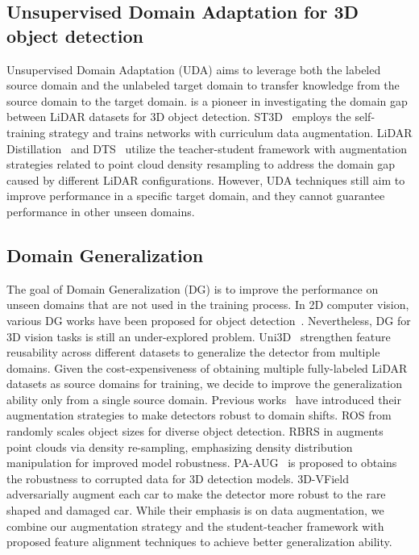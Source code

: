 \subsection{Unsupervised Domain Adaptation for 3D object detection}
Unsupervised Domain Adaptation (UDA) aims to leverage both the labeled source domain and the unlabeled target domain to transfer knowledge from the source domain to the target domain. \cite{wang2020train} is a pioneer in investigating the domain gap between LiDAR datasets for 3D object detection. ST3D~\cite{yang2021st3d} employs the self-training strategy and trains networks with curriculum data augmentation. LiDAR Distillation~\cite{wei2022lidar} and DTS~\cite{hu2023density} utilize the teacher-student framework with augmentation strategies related to point cloud density resampling to address the domain gap caused by different LiDAR configurations. However, UDA techniques still aim to improve performance in a specific target domain, and they cannot guarantee performance in other unseen domains.

\subsection{Domain Generalization}
The goal of Domain Generalization (DG) is to improve the performance on unseen domains that are not used in the training process. In 2D computer vision, various DG works have been proposed for object detection~\cite{wu2022single, vidit2023clip}. Nevertheless, DG for 3D vision tasks is still an under-explored problem. Uni3D~\cite{zhang2023uni3d} strengthen feature reusability across different datasets to generalize the detector from multiple domains. Given the cost-expensiveness of obtaining multiple fully-labeled LiDAR datasets as source domains for training, we decide to improve the generalization ability only from a single source domain. Previous works~\cite{yang2021st3d, choi2021part, lehner20223d, hu2023density} have introduced their augmentation strategies to make detectors robust to domain shifts. ROS from \cite{yang2021st3d} randomly scales object sizes for diverse object detection. RBRS in \cite{hu2023density} augments point clouds via density re-sampling, emphasizing density distribution manipulation for improved model robustness. PA-AUG~\cite{choi2021part} is proposed to obtains the robustness to corrupted data for 3D detection models. 3D-VField~\cite{lehner20223d} adversarially augment each car to make the detector more robust to the rare shaped and damaged car. While their emphasis is on data augmentation, we combine our augmentation strategy and the student-teacher framework with proposed feature alignment techniques to achieve better generalization ability.

